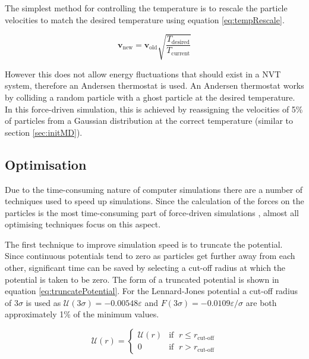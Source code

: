 \documentclass[12pt]{UoAthesis}
\begin{document}
The simplest method for controlling the temperature is to rescale the
particle velocities to match the desired temperature using equation
\eqref{eq:tempRescale}. 

\begin{equation}
  \label{eq:tempRescale}
  \mathbf{v}_{\text{new}} = \mathbf{v}_{\text{old}} \sqrt{\frac{T_{\text{desired}}}{T_{\text{current}}}}
\end{equation}

However this does not allow energy fluctuations that should exist in a
NVT system, therefore an Andersen thermostat\cite{Andersen1980} is
used.  An Andersen thermostat works by colliding a random particle
with a ghost particle at the desired temperature.  In this
force-driven simulation, this is achieved by reassigning the
velocities of 5\% of particles from a Gaussian distribution at the
correct temperature (similar to section \ref{sec:initMD}).

\subsection{Optimisation}

Due to the time-consuming nature of computer simulations there are a
number of techniques used to speed up simulations.  Since the
calculation of the forces on the particles is the most time-consuming
part of force-driven simulations \cite{Frenkel2002}, almost all
optimising techniques focus on this aspect.

The first technique to improve simulation speed is to truncate the
potential.  Since continuous potentials tend to zero as particles get
further away from each other, significant time can be saved by
selecting a cut-off radius at which the potential is taken to be zero.
The form of a truncated potential is shown in equation
\eqref{eq:truncatePotential}.  For the Lennard-Jones potential a
cut-off radius of $3\sigma$ is used as $\mathcal{U}(3\sigma) =
-0.00548\varepsilon$ and $F(3\sigma) = -0.0109\varepsilon/\sigma$ are
both approximately 1\% of the minimum values.

\begin{equation}
  \label{eq:truncatePotential}
  \mathcal{U}(r) = 
  \begin{cases}
    \mathcal{U}(r) &\text{if }\; r \leq r_{\text{cut-off}} \\
    0 & \text{if }\; r > r_{\text{cut-off}} 
  \end{cases}
\end{equation}
\end{document}
